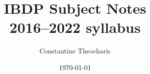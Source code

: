 

\title{%
    IBDP Subject Notes \\[0.75em]
    \large 2016--2022 syllabus
    }

\author{Constantine Theocharis}

\date{\today}


\maketitle
\tableofcontents




